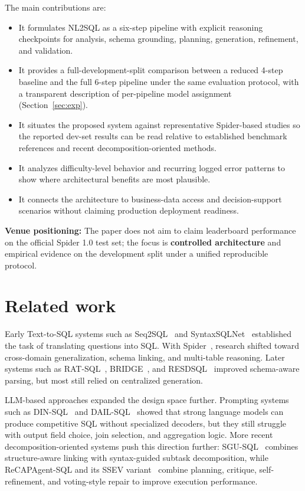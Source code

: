 The main contributions are:
\begin{itemize}
  \item It formulates NL2SQL as a six-step pipeline with explicit reasoning checkpoints for analysis, schema grounding, planning, generation, refinement, and validation.
  \item It provides a full-development-split comparison between a reduced 4-step baseline and the full 6-step pipeline under the same evaluation protocol, with a transparent description of per-pipeline model assignment (Section~\ref{sec:exp}).
  \item It situates the proposed system against representative Spider-based studies so the reported dev-set results can be read relative to established benchmark references and recent decomposition-oriented methods.
  \item It analyzes difficulty-level behavior and recurring logged error patterns to show where architectural benefits are most plausible.
  \item It connects the architecture to business-data access and decision-support scenarios without claiming production deployment readiness.
\end{itemize}

\textbf{Venue positioning:} The paper does not aim to claim leaderboard performance on the official Spider 1.0 test set; the focus is \textbf{controlled architecture} and empirical evidence on the development split under a unified reproducible protocol.

\section{Related work}\label{sec:related}

Early Text-to-SQL systems such as Seq2SQL~\cite{zhong2017seq2sql} and SyntaxSQLNet~\cite{yu2018syntaxsqlnet} established the task of translating questions into SQL. With Spider~\cite{yu2018spider}, research shifted toward cross-domain generalization, schema linking, and multi-table reasoning. Later systems such as RAT-SQL~\cite{wang2020ratsql}, BRIDGE~\cite{lin2020bridge}, and RESDSQL~\cite{li2023resdsql} improved schema-aware parsing, but most still relied on centralized generation.

LLM-based approaches expanded the design space further. Prompting systems such as DIN-SQL~\cite{pourreza2023dinsql} and DAIL-SQL~\cite{gao2023dailsql} showed that strong language models can produce competitive SQL without specialized decoders, but they still struggle with output field choice, join selection, and aggregation logic. More recent decomposition-oriented systems push this direction further: SGU-SQL~\cite{cao2024sgusql} combines structure-aware linking with syntax-guided subtask decomposition, while ReCAPAgent-SQL and its SSEV variant~\cite{lv2026llmsqlvoting} combine planning, critique, self-refinement, and voting-style repair to improve execution performance.

